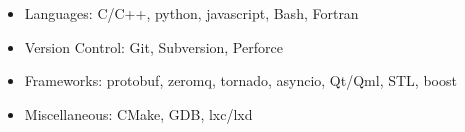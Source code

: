 \documentclass[11pt,a4paper,sans]{moderncv}        %
\begin{document}
\begin{itemize}
  \item{Languages: C/C++, python, javascript, Bash, Fortran}
  \item{Version Control: Git, Subversion, Perforce}
  \item{Frameworks: protobuf, zeromq, tornado, asyncio, Qt/Qml, STL, boost}
  \item{Miscellaneous: CMake, GDB, lxc/lxd}
\end{itemize}



\nocite{*}



\end{document}
